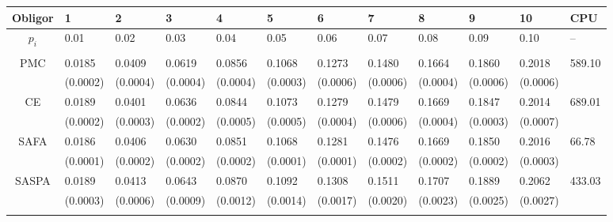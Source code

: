 \documentclass{article}
\newcommand{\VaRC}{\text{VaRC}}
\begin{document}
\begin{table}[p]
\centering
\footnotesize
\begin{threeparttable}
\begin{tabularx}{\textwidth}{@{}c*{10}{Y}Y@{}}
\toprule
Obligor    & 1 & 2 & 3 & 4 & 5 & 6 & 7 & 8 & 9 & 10 & CPU\tnote{*} \\
\midrule
$p_i$      & 0.01 & 0.02 & 0.03 & 0.04 & 0.05 & 0.06 & 0.07 & 0.08 & 0.09 & 0.10 & -- \\
\addlinespace[2pt]

\multicolumn{12}{@{}l}{$\VaRC_{0.95}$}\\
\cmidrule(lr){1-1}
PMC        & 0.0185 & 0.0409 & 0.0619 & 0.0856 & 0.1068 & 0.1273 & 0.1480 & 0.1664 & 0.1860 & 0.2018 & 589.10 \\
           & (0.0002) & (0.0004) & (0.0004) & (0.0004) & (0.0003) & (0.0006) & (0.0006) & (0.0004) & (0.0006) & (0.0006) & \\
CE         & 0.0189 & 0.0401 & 0.0636 & 0.0844 & 0.1073 & 0.1279 & 0.1479 & 0.1669 & 0.1847 & 0.2014 & 689.01 \\ %
           & (0.0002) & (0.0003) & (0.0002) & (0.0005) & (0.0005) & (0.0004) & (0.0006) & (0.0004) & (0.0003) & (0.0007) & \\
SAFA       & 0.0186 & 0.0406 & 0.0630 & 0.0851 & 0.1068 & 0.1281 & 0.1476 & 0.1669 & 0.1850 & 0.2016 & 66.78 \\
           & (0.0001) & (0.0002) & (0.0002) & (0.0002) & (0.0001) & (0.0001) & (0.0002) & (0.0002) & (0.0002) & (0.0003) & \\
SASPA	   & 0.0189	& 0.0413 & 0.0643 & 0.0870 & 0.1092 & 0.1308 & 0.1511 & 0.1707 & 0.1889 & 0.2062 & 433.03 \\
    	   & (0.0003) & (0.0006) & (0.0009) & (0.0012) & (0.0014) & (0.0017) & (0.0020) & (0.0023) & (0.0025) & (0.0027) & \\
\addlinespace[2pt]


\end{tabularx}
\end{threeparttable}
\end{table}
\end{document}

